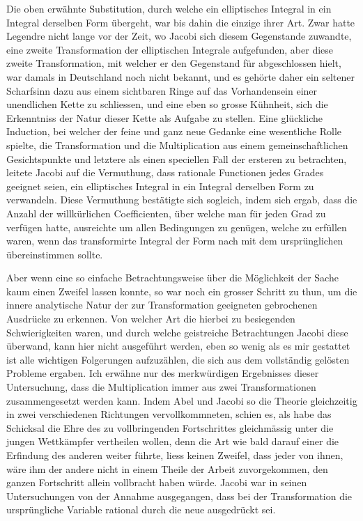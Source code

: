 \documentclass[11pt]{article}
\begin{document}
Die oben erwähnte Substitution, durch welche ein elliptisches Integral in ein Integral derselben Form übergeht, war bis dahin die einzige ihrer Art. Zwar hatte Legendre nicht lange vor der Zeit, wo Jacobi sich diesem Gegenstande zuwandte, eine zweite Transformation der elliptischen Integrale aufgefunden, aber diese zweite Transformation, mit welcher er den Gegenstand für abgeschlossen hielt, war damals in Deutschland noch nicht bekannt, und es gehörte daher ein seltener Scharfsinn dazu aus einem sichtbaren Ringe auf das Vorhandensein einer unendlichen Kette zu schliessen, und eine eben so grosse Kühnheit, sich die Erkenntniss der Natur dieser Kette als Aufgabe zu stellen. Eine glückliche Induction, bei welcher der feine und ganz neue Gedanke eine wesentliche Rolle spielte, die Transformation und die Multiplication aus einem gemeinschaftlichen Gesichtspunkte und letztere als einen speciellen Fall der ersteren zu betrachten, leitete Jacobi auf die Vermuthung, dass rationale Functionen jedes Grades geeignet seien, ein elliptisches Integral in ein Integral derselben Form zu verwandeln. Diese Vermuthung bestätigte sich sogleich, indem sich ergab, dass die Anzahl der willkürlichen Coefficienten, über welche man für jeden Grad zu verfügen hatte, ausreichte um allen Bedingungen zu genügen, welche zu erfüllen waren, wenn das transformirte Integral der Form nach mit dem ursprünglichen übereinstimmen sollte.

Aber wenn eine so einfache Betrachtungsweise über die Möglichkeit der Sache kaum einen Zweifel lassen konnte, so war noch ein grosser Schritt zu thun, um die innere analytische Natur der zur Transformation geeigneten gebrochenen Ausdrücke zu erkennen. Von welcher Art die hierbei zu besiegenden Schwierigkeiten waren, und durch welche geistreiche Betrachtungen Jacobi diese überwand, kann hier nicht ausgeführt werden, eben so wenig als es mir gestattet ist alle wichtigen Folgerungen aufzuzählen, die sich aus dem vollständig gelösten Probleme ergaben. Ich erwähne nur des merkwürdigen Ergebnisses dieser Untersuchung, dass die Multiplication immer aus zwei Transformationen zusammengesetzt werden kann. Indem Abel und Jacobi so die Theorie gleichzeitig in zwei verschiedenen Richtungen vervollkommneten, schien es, als habe das Schicksal die Ehre des zu vollbringenden Fortschrittes gleichmässig unter die jungen Wettkämpfer vertheilen wollen, denn die Art wie bald darauf einer die Erfindung des anderen weiter führte, liess keinen Zweifel, dass jeder von ihnen, wäre ihm der andere nicht in einem Theile der Arbeit zuvorgekommen, den ganzen Fortschritt allein vollbracht haben würde. Jacobi war in seinen Untersuchungen von der Annahme ausgegangen, dass bei der Transformation die ursprüngliche Variable rational durch die neue ausgedrückt sei.
\end{document}

